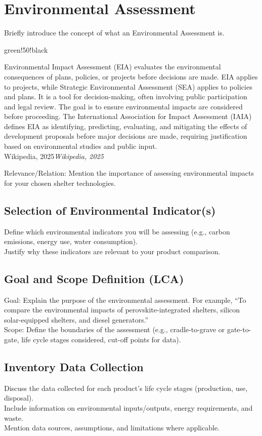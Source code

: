 \documentclass{article}
\newcommand{\formalsource}{}
\newenvironment{formal}[3][]{	\renewcommand{\formalsource}{#1}
	\def\lefty{\color{#2}\textquotedblleft}
	\def\righty{\color{#2}\textquotedblright}
	\def\FrameCommand{%
		\hspace{1pt}%
		{\color{#2}\vrule width 2pt}%
		{\color{#3}\vrule width 4pt}%
		\colorbox{#3}%
	}%
	\MakeFramed{\advance\hsize-\width\FrameRestore}%
    \begin{adjustwidth}{5pt}{7pt}%
	\vspace{4pt}%
	\ifx#2\empty\else\smash{\raisebox{-0.5em}{\huge\lefty}}\hspace{0em}\fi%
	}{%
	\hspace{0em}\smash{\raisebox{-0.5em}{\huge\righty}}\\%
	\vspace{0pt}%
	\ifx\formalsource\empty\else\hfill{\footnotesize\textit{\formalsource}}\fi%
\end{adjustwidth}%
\endMakeFramed%
\noindent%
}
\begin{document}
\newpage
\section{Environmental Assessment}

Briefly introduce the concept of what an Environmental Assessment is.
\begin{formal}[Wikipedia, 2025]{green!50!black}{white}
	Environmental Impact Assessment (EIA) evaluates the environmental consequences of plans, policies, or projects before decisions are made. EIA applies to projects, while Strategic Environmental Assessment (SEA) applies to policies and plans. It is a tool for decision-making, often involving public participation and legal review. The goal is to ensure environmental impacts are considered before proceeding. The International Association for Impact Assessment (IAIA) defines EIA as identifying, predicting, evaluating, and mitigating the effects of development proposals before major decisions are made, requiring justification based on environmental studies and public input.
\end{formal}
Relevance/Relation: Mention the importance of assessing environmental impacts for your chosen shelter technologies.
\subsection{Selection of Environmental Indicator(s)}
Define which environmental indicators you will be assessing (e.g., carbon emissions, energy use, water consumption).\\
Justify why these indicators are relevant to your product comparison.
\subsection{Goal and Scope Definition (LCA)}
Goal: Explain the purpose of the environmental assessment. For example, “To compare the environmental impacts of perovskite-integrated shelters, silicon solar-equipped shelters, and diesel generators.”\\[8pt]
Scope: Define the boundaries of the assessment (e.g., cradle-to-grave or gate-to-gate, life cycle stages considered, cut-off points for data).
\subsection{Inventory Data Collection}
Discuss the data collected for each product’s life cycle stages (production, use, disposal).\\[8pt]
Include information on environmental inputs/outputs, energy requirements, and waste.\\[8pt]
Mention data sources, assumptions, and limitations where applicable.
\end{document}
